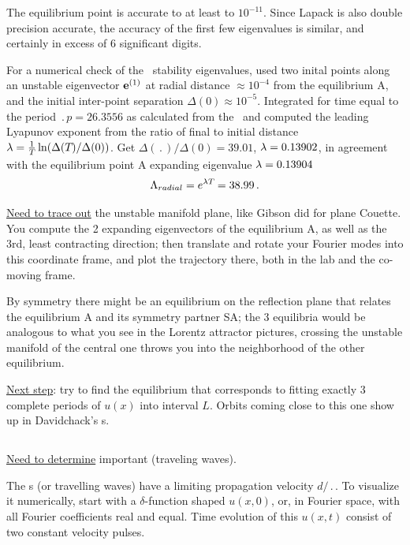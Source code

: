 The equilibrium point is accurate to at least to $10^{-11}$. Since
Lapack is also double precision accurate, the accuracy of the first
few eigenvalues is similar, and certainly in
excess of 6 significant digits.



For a numerical check of the \rpo\ stability eigenvalues,
used two inital
points along an unstable eigenvector ${\bf e}^{(1)}$
at radial distance  $\approx 10^{-4}$ from the equilibrium A,
and the initial inter-point separation $\Delta(0) \approx 10^{-5}$.
Integrated for time equal to the period $\period{p}=26.3556$ as calculated from
the \jacobianM\ and computed the leading Lyapunov exponent from the ratio of
final to initial distance 
$\lambda= {1 \over {T_{}}}\ln( \Delta({T_{}})/\Delta(0))$.
Get
$\Delta(\period{})/\Delta(0) =39.01$,
$\lambda=0.13902$, in agreement with the equilibrium point A 
expanding eigenvalue $\lambda=0.13904$
\[
\Lambda_{radial} =  e^{\lambda {T_{}}} =38.99
\,.
\]

\underline{Need to trace out}
the unstable manifold plane, like Gibson did for plane Couette.
You compute the 2 expanding eigenvectors of the
equilibrium A, as well as the 3rd, least contracting direction; then
translate and rotate your Fourier modes into this coordinate frame,
and plot the trajectory there, both in the lab and the co-moving frame.

By symmetry there might be an equilibrium on the reflection plane that
relates the equilibrium A and its symmetry partner SA; the 3 equilibria would
be analogous to what you see in the Lorentz attractor pictures, crossing
the unstable manifold of the central one throws you into the neighborhood
of the other equilibrium.

\underline{Next step}: try to find the equilibrium that corresponds to fitting
exactly 3 complete periods of $u(x)$ into interval $L$.
Orbits coming close to this one
show up in Davidchack's \rpo s.

\subsection{\Reqva}

\underline{Need to determine} important {\Reqva} (traveling waves).

The \reqva s (or travelling waves) have a limiting propagation
velocity $d/\period{}$. To visualize it numerically,
start with a $\delta$-function
shaped $u(x,0)$, or, in Fourier space, with all Fourier coefficients real
and equal. Time evolution of this  $u(x,t)$ consist of two constant 
velocity pulses.

